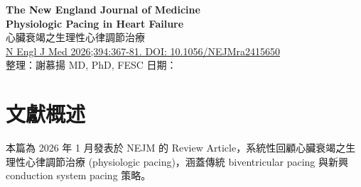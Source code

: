 \documentclass[12pt,a4paper]{article}
\begin{document}

\begin{center}
{\LARGE\bfseries\textcolor{emergency_red}{The New England Journal of Medicine}}\\[0.5cm]
{\Large\textbf{Physiologic Pacing in Heart Failure}}\\[0.3cm]
{\large 心臟衰竭之生理性心律調節治療}\\[0.5cm]
{\normalsize \href{https://doi.org/10.1056/NEJMra2415650}{N Engl J Med 2026;394:367-81. DOI: 10.1056/NEJMra2415650}}\\[0.3cm]
{\normalsize 整理：謝慕揚 MD, PhD, FESC \quad 日期：\mydate}
\end{center}

\vspace{0.5cm}



\tableofcontents
\newpage

\section{文獻概述}

本篇為 2026 年 1 月發表於 NEJM 的 Review Article，系統性回顧心臟衰竭之生理性心律調節治療 (physiologic pacing)，涵蓋傳統 biventricular pacing 與新興 conduction system pacing 策略。
\end{document}
